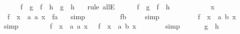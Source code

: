 \begin{isabellebody}
\ \ \isamarkupfalse%
\ {}{\isacharcolon}\ {\isachardoublequoteopen}\ {\isacharparenleft}f\ {\isasymcirc}\ {\isacharquery}g\ {\isacharequal}\ f\ {\isasymcirc}\ {\isacharquery}h\ {\isasymlongrightarrow}\ {\isacharquery}g\ {\isacharequal}\ {\isacharquery}h{\isacharparenright}{\isachardoublequoteclose}\ \ \isamarkupfalse%
\ {\isacharparenleft}rule\ allE{\isacharparenright}\ \isanewline
\ \ \isamarkupfalse%
\ {}{\isacharcolon}\ {\isachardoublequoteopen}f\ {\isasymcirc}\ {\isacharquery}g\ {\isacharequal}\ f\ {\isasymcirc}\ {\isacharquery}h{\isachardoublequoteclose}\ \isanewline
\ \ \isamarkupfalse%
\ \isanewline
\ \ \ \ \isamarkupfalse%
\ x\isanewline
\ \ \ \ \isamarkupfalse%
\ {\isachardoublequoteopen}\ {\isacharparenleft}f\ {\isasymcirc}\ {\isacharparenleft}{\isasymlambda}x\ {\isacharcolon}{\isacharcolon}\ {\isacharprime}a{\isachardot}\ a{\isacharparenright}{\isacharparenright}\ x\ {\isacharequal}\ f{\isacharparenleft}a{\isacharparenright}\ {\isachardoublequoteclose}\ \isamarkupfalse%
\ simp\isanewline
\ \ \ \ \isamarkupfalse%
\ \isamarkupfalse%
\ {\isachardoublequoteopen}{\isachardot}{\isachardot}{\isachardot}\ {\isacharequal}\ f{\isacharparenleft}b{\isacharparenright}{\isachardoublequoteclose}\ \isamarkupfalse%
\ {}\ \isamarkupfalse%
\ simp\isanewline
\ \ \ \ \isamarkupfalse%
\ \isamarkupfalse%
\ {\isachardoublequoteopen}{\isachardot}{\isachardot}{\isachardot}\ {\isacharequal}\ \ {\isacharparenleft}f\ {\isasymcirc}\ {\isacharparenleft}{\isasymlambda}x\ {\isacharcolon}{\isacharcolon}\ {\isacharprime}a{\isachardot}\ b{\isacharparenright}{\isacharparenright}\ x{\isachardoublequoteclose}\ \isamarkupfalse%
\ simp\isanewline
\ \ \ \ \isamarkupfalse%
\ \isamarkupfalse%
\ {\isachardoublequoteopen}\ {\isacharparenleft}f\ {\isasymcirc}\ {\isacharparenleft}{\isasymlambda}x\ {\isacharcolon}{\isacharcolon}\ {\isacharprime}a{\isachardot}\ a{\isacharparenright}{\isacharparenright}\ x\ {\isacharequal}\ \ {\isacharparenleft}f\ {\isasymcirc}\ {\isacharparenleft}{\isasymlambda}x\ {\isacharcolon}{\isacharcolon}\ {\isacharprime}a{\isachardot}\ b{\isacharparenright}{\isacharparenright}\ x{\isachardoublequoteclose}\isanewline
\ \ \ \ \ \ \isamarkupfalse%
\ simp\isanewline
\ \ \isamarkupfalse%
\isanewline
\ \ \isamarkupfalse%
\ {\isachardoublequoteopen}{\isacharquery}g\ {\isacharequal}\ {\isacharquery}h{\isachardoublequoteclose}\ \isamarkupfalse%

\end{isabellebody}
